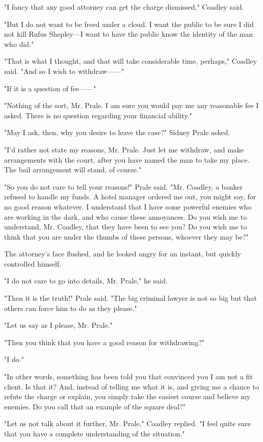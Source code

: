 \documentclass{novel}
\begin{document}
"I fancy that any good attorney can get the charge dismissed," Coadley said.

"But I do not want to be freed under a cloud. I want the public to be sure I did not kill Rufus Shepley---I want to have the public know the identity of the man who did."

"That is what I thought, and that will take considerable time, perhaps," Coadley said. "And so I wish to withdraw------"

"If it is a question of fee------"

"Nothing of the sort, Mr. Prale. I am sure you would pay me any reasonable fee I asked. There is no question regarding your financial ability."

"May I ask, then, why you desire to leave the case?" Sidney Prale asked.

"I'd rather not state my reasons, Mr. Prale. Just let me withdraw, and make arrangements with the court, after you have named the man to take my place. The bail arrangement will stand, of course."

"So you do not care to tell your reasons!" Prale said. "Mr. Coadley, a banker refused to handle my funds. A hotel manager ordered me out, you might say, for no good reason whatever. I understand that I have some powerful enemies who are working in the dark, and who cause these annoyances. Do you wish me to understand, Mr. Coadley, that they have been to see you? Do you wish me to think that you are under the thumbs of these persons, whoever they may be?"

The attorney's face flushed, and he looked angry for an instant, but quickly controlled himself.

"I do not care to go into details, Mr. Prale," he said.

"Then it is the truth!" Prale said. "The big criminal lawyer is not so big but that others can force him to do as they please."

"Let us say as I please, Mr. Prale."

"Then you think that you have a good reason for withdrawing?"

"I do."

"In other words, something has been told you that convinced you I am not a fit client. Is that it? And, instead of telling me what it is, and giving me a chance to refute the charge or explain, you simply take the easiest course and believe my enemies. Do you call that an example of the square deal?"

"Let us not talk about it further, Mr. Prale," Coadley replied. "I feel quite sure that you have a complete understanding of the situation."
\end{document}
